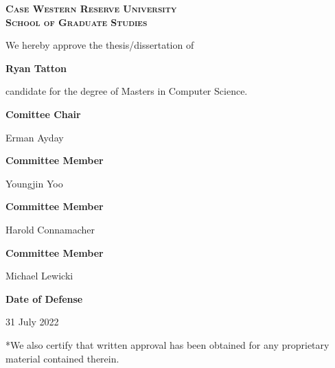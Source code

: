 %
%
%

\begin{titlepage}
\begin{large}
\textsc{\bfseries Case Western Reserve University}\\
\textsc{\bfseries School of Graduate Studies}

We hereby approve the thesis/dissertation of

\textbf{Ryan Tatton}

candidate for the degree of Masters in Computer Science.

\textbf{Comittee Chair}

Erman Ayday

\textbf{Committee Member}

Youngjin Yoo

\textbf{Committee Member}

Harold Connamacher

\textbf{Committee Member}

Michael Lewicki

\textbf{Date of Defense}

31 July 2022

*We also certify that written approval has been obtained for any proprietary material contained therein.

%
%
\end{large}
\end{titlepage}

